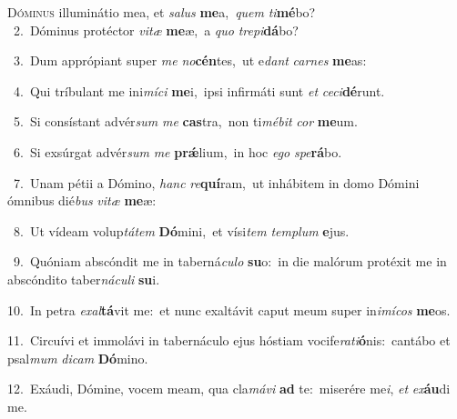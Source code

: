 \lettrine{\initial\textcolor{\initialcolor}{D}}{óminus} illuminátio mea, et \textit{sa}\-\textit{lus} \textbf{me}\-a,~\star \textit{quem} \textit{ti}\-\textbf{mé}bo?\\
{\numbfont\textcolor{\numbcolor}{~2.}}~Dóminus protéctor \textit{vi}\-\textit{tæ} \textbf{me}\-æ,~\star a \textit{quo} \textit{tre}\-\textit{pi}\textbf{dá}bo?\par
{\numbfont\textcolor{\numbcolor}{~3.}}~Dum apprópiant super \textit{me} \textit{no}\-\textbf{cén}tes,~\star ut e\textit{dant} \textit{car}\-\textit{nes} \textbf{me}\-as:\par
{\numbfont\textcolor{\numbcolor}{~4.}}~Qui tríbulant me ini\-\textit{mí}\-\textit{ci} \textbf{me}\-i,~\star ipsi infirmáti sunt \textit{et} \textit{ce}\-\textit{ci}\textbf{dé}runt.\par
{\numbfont\textcolor{\numbcolor}{~5.}}~Si consístant advér\textit{sum} \textit{me} \textbf{cas}\-tra,~\star non ti\-\textit{mé}\-\textit{bit} \textit{cor} \textbf{me}\-um.\par
{\numbfont\textcolor{\numbcolor}{~6.}}~Si exsúrgat advér\textit{sum} \textit{me} \textbf{prǽ}\-lium,~\star in hoc \textit{e}\-\textit{go} \textit{spe}\-\textbf{rá}bo.\par
{\numbfont\textcolor{\numbcolor}{~7.}}~Unam pétii a Dómino, \textit{hanc} \textit{re}\-\textbf{quí}ram,~\star ut inhábitem in domo Dómini ómnibus dié\textit{bus} \textit{vi}\-\textit{tæ} \textbf{me}\-æ:\par
{\numbfont\textcolor{\numbcolor}{~8.}}~Ut vídeam volup\-\textit{tá}\-\textit{tem} \textbf{Dó}\-mini,~\star et vísi\textit{tem} \textit{tem}\-\textit{plum} \textbf{e}\-jus.\par
{\numbfont\textcolor{\numbcolor}{~9.}}~Quóniam abscóndit me in taberná\-\textit{cu}\-\textit{lo} \textbf{su}\-o:~\star in die malórum protéxit me in abscóndito taber\-\textit{ná}\-\textit{cu}\textit{li} \textbf{su}\-i.\par
{\numbfont\textcolor{\numbcolor}{10.}}~In petra \textit{ex}\-\textit{al}\textbf{tá}vit me:~\star et nunc exaltávit caput meum super in\-\textit{i}\-\textit{mí}\textit{cos} \textbf{me}\-os.\par
{\numbfont\textcolor{\numbcolor}{11.}}~Circuívi et immolávi in tabernáculo ejus hóstiam vocife\-\textit{ra}\-\textit{ti}\textbf{ó}nis:~\star cantábo et psal\textit{mum} \textit{di}\-\textit{cam} \textbf{Dó}\-mino.\par
{\numbfont\textcolor{\numbcolor}{12.}}~Exáudi, Dómine, vocem meam, qua cla\-\textit{má}\-\textit{vi} \textbf{ad} te:~\star miserére me\-\textit{i}\-, \textit{et} \textit{ex}\-\textbf{áu}di me.\par

